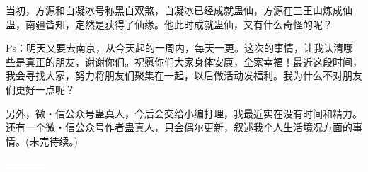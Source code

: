 \begin{this_body}
当初，方源和白凝冰号称黑白双煞，白凝冰已经成就蛊仙，方源在三王山炼成仙蛊，南疆皆知，定然是获得了仙缘。他此时成就蛊仙，又有什么奇怪的呢？

Ps：明天又要去南京，从今天起的一周内，每天一更。这次的事情，让我认清哪些是真正的朋友，谢谢你们。祝愿你们大家身体安康，全家幸福！最近这段时间，我会寻找大家，努力将朋友们聚集在一起，以后做活动发福利。我为什么不对朋友们更好一点呢？

另外，微・信公众号蛊真人，今后会交给小编打理，我最近实在没有时间和精力。还有一个微・信公众号作者蛊真人，只会偶尔更新，叙述我个人生活境况方面的事情。(未完待续。)

------------

\end{this_body}

